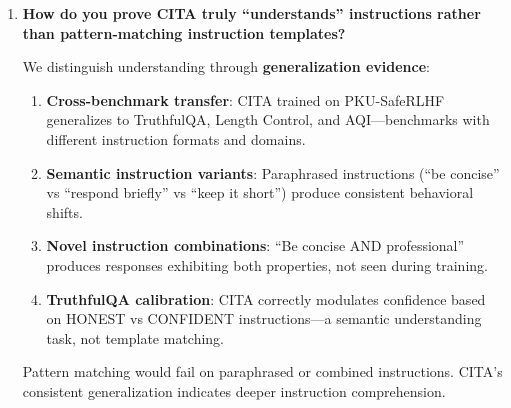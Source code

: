 \begin{enumerate}[label=\textbf{Q\arabic*.}, leftmargin=*, itemsep=8pt]
\begin{enumerate}[leftmargin=*,itemsep=2pt]
    \item \textbf{Constitutional baselines}~\cite{bai2022constitutional}: Non-negotiable safety constraints can be trained as immutable base behaviors.

    \item \textbf{Audit trails}: Instruction logging enables detection of adversarial patterns.
\end{enumerate}

\textbf{Key point}: CITA doesn't create new attack surfaces---it makes existing controllability \textit{explicit and auditable}. A DPO model can also be fine-tuned maliciously; CITA's instruction interface is more transparent.

\vspace{4mm}

\item \textbf{How do you prove CITA truly ``understands'' instructions rather than pattern-matching instruction templates?}

 We distinguish understanding through \textbf{generalization evidence}:

\begin{enumerate}[leftmargin=*,itemsep=2pt]
    \item \textbf{Cross-benchmark transfer}: CITA trained on PKU-SafeRLHF generalizes to TruthfulQA, Length Control, and AQI---benchmarks with different instruction formats and domains.

    \item \textbf{Semantic instruction variants}: Paraphrased instructions (``be concise'' vs ``respond briefly'' vs ``keep it short'') produce consistent behavioral shifts.

    \item \textbf{Novel instruction combinations}: ``Be concise AND professional'' produces responses exhibiting both properties, not seen during training.

    \item \textbf{TruthfulQA calibration}: CITA correctly modulates confidence based on HONEST vs CONFIDENT instructions---a semantic understanding task, not template matching.
\end{enumerate}

Pattern matching would fail on paraphrased or combined instructions. CITA's consistent generalization indicates deeper instruction comprehension.

\vspace{4mm}


\end{enumerate}
